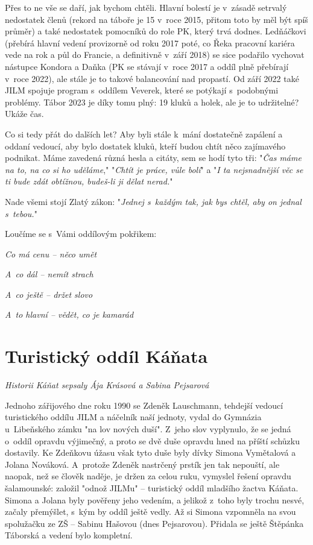 \documentclass[a5paper, 12pt, twoside]{article}
\begin{document}
Přes to ne vše se daří, jak bychom chtěli. Hlavní bolestí je v~zásadě
setrvalý nedostatek členů (rekord na táboře je 15 v~roce 2015, přitom
toto by měl být spíš průměr) a také nedostatek pomocníků do role PK,
který trvá dodnes. Ledňáčkovi (přebírá hlavní vedení provizorně od roku
2017 poté, co Řeka pracovní kariéra vede na rok a půl do Francie, a
definitivně v~září 2018) se sice podařilo vychovat nástupce Kondora a
Daňka (PK se stávají v~roce 2017 a oddíl plně přebírají v~roce 2022),
ale stále je to takové balancování nad propastí. Od září 2022 také JILM
spojuje program s~oddílem Veverek, které se potýkají s~podobnými
problémy. Tábor 2023 je díky tomu plný: 19 kluků a holek, ale je to
udržitelné? Ukáže čas.

Co si tedy přát do dalších let? Aby byli stále k~mání dostatečně
zapálení a oddaní vedoucí, aby bylo dostatek kluků, kteří budou chtít
něco zajímavého podnikat. Máme zavedená různá hesla a citáty, sem se
hodí tyto tři: "\textit{Čas máme na to, na co si ho uděláme},"
"\textit{Chtít je práce, vůle bolí}" a "\textit{I ta nejsnadnější věc se
ti bude zdát obtížnou, budeš-li ji dělat nerad.}"

Nade všemi stojí Zlatý zákon: "\textit{Jednej s~každým tak, jak bys
chtěl, aby on jednal s~tebou.}"

Loučíme se s~Vámi oddílovým pokřikem:

\textit{Co má cenu -- něco umět}

\textit{A~co dál -- nemít strach}

\textit{A~co ještě -- držet slovo}

\textit{A~to hlavní -- vědět, co je kamarád}

\section{Turistický oddíl
Káňata}

\textit{Historii Káňat sepsaly Ája Krásová a Sabina Pejsarová}

Jednoho zářijového dne roku 1990 se Zdeněk Lauschmann, tehdejší vedoucí
turistického oddílu JILM a náčelník naší jednoty, vydal do Gymnázia
u~Libeňského zámku "na lov nových duší". Z~jeho slov vyplynulo, že se
jedná o~oddíl opravdu výjimečný, a proto se dvě duše opravdu hned na
příští schůzku dostavily. Ke Zdeňkovu úžasu však tyto duše byly dívky
Simona Vymětalová a Jolana Nováková. A~protože Zdeněk nastrčený prstík
jen tak nepouští, ale naopak, než se člověk naděje, je držen za celou
ruku, vymyslel řešení opravdu šalamounské: založil "odnož JILMu" --
turistický oddíl mladšího žactva Káňata. Simona a Jolana byly pověřeny
jeho vedením, a jelikož z~toho byly trochu nesvé, začaly přemýšlet,
s~kým by oddíl ještě vedly. Až si Simona vzpomněla na svou spolužačku ze
ZŠ -- Sabinu Hašovou (dnes Pejsarovou). Přidala se ještě Štěpánka
Táborská a vedení bylo kompletní.
\end{document}
